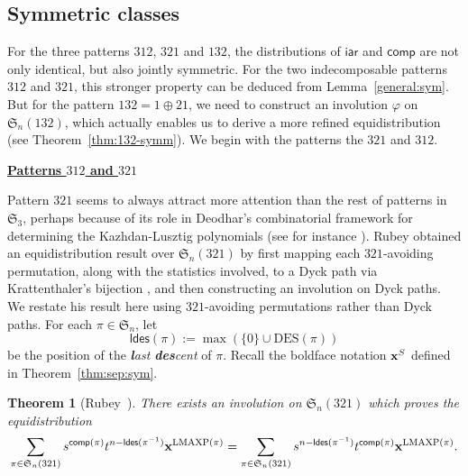 \documentclass[12pt]{amsart}
\numberwithin{equation}{section}
\theoremstyle{plain}
\newtheorem{theorem}{Theorem}[section]
\theoremstyle{definition}
\def\S{\mathfrak{S}}
\def\iar{\mathsf{iar}}
\def\comp{\mathsf{comp}}
\def\DES{\mathrm{DES}}
\def\LMAXP{\mathrm{LMAXP}}
\def\ldes{\mathsf{ldes}}
\begin{document}
\subsection{Symmetric classes}\label{sym:3.1}
For the three patterns $312$, $321$ and $132$, the distributions of $\iar$ and $\comp$ are not only identical, but also jointly symmetric. For the two indecomposable patterns $312$ and $321$, this stronger property can be deduced from Lemma~\ref{general:sym}. But for the pattern $132=1\oplus 21$, we need to construct an involution $\varphi$ on $\S_n(132)$, which actually enables us to derive a more refined equidistribution (see Theorem~\ref{thm:132-symm}). We begin with the patterns the $321$ and $312$.




\medskip
\noindent \underline{\bf Patterns $312$ and $321$}
\medskip

Pattern $321$ seems to always attract more attention than the rest of patterns in $\S_3$, perhaps because of its role in Deodhar's combinatorial framework for determining the Kazhdan-Lusztig polynomials (see for instance \cite{BW}). Rubey \cite{rub} obtained an equidistribution result over $\S_n(321)$ by first mapping each $321$-avoiding permutation, along with the statistics involved, to a Dyck path via Krattenthaler's bijection \cite{kra}, and then constructing an involution on Dyck paths. We restate his result here using $321$-avoiding permutations rather than Dyck paths. For each $\pi\in\S_n$, let 
$$\ldes(\pi):=\max(\{0\}\cup\DES(\pi))
$$
be the position of the {\em {\bf\em l}ast {\bf\em des}cent} of $\pi$. Recall the boldface notation ${\bf x}^S$ defined in Theorem~\ref{thm:sep:sym}.
\begin{theorem}[Rubey~\cite{rub}]\label{thm:Rubey}
There exists an involution on $\S_n(321)$ which proves the equidistribution
\begin{equation}\label{equ:rubey}
\sum_{\pi\in\S_n(321)}s^{\comp(\pi)}t^{n-\ldes(\pi^{-1})}{\bf x}^{\LMAXP(\pi)}=\sum_{\pi\in\S_n(321)}s^{n-\ldes(\pi^{-1})}t^{\comp(\pi)}{\bf x}^{\LMAXP(\pi)}.
\end{equation}
\end{theorem} 
\end{document}
